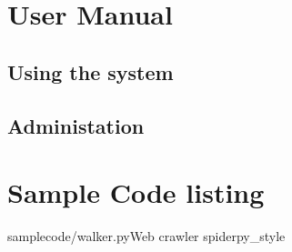 \appendix
\chapter{User Manual}
\section{Using the system}
\section{Administation}

\chapter{Sample Code listing}
	\newpage
	\begin{codesnippet}{samplecode/walker.py}{Web crawler spider}{py_style}
	\end{codesnippet}
